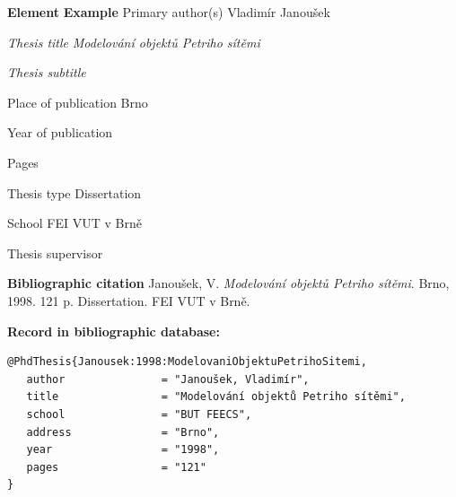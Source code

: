\newpage
\label{pr-akademicka-prace2}
\begin{tabbing} 
\zarazky
\textbf{Element} \> \textbf{Example} \odradkovani
Primary author(s) \>
Vladimír {\sc Janoušek}

\odradkovani
{\em Thesis title} \>
{\em Modelování objektů Petriho sítěmi}

\odradkovani
{\em Thesis subtitle}\footnotemark[1] \>

\odradkovani
Place of publication \>
Brno

\odradkovani
Year of publication 

\odradkovani
Pages\footnotemark[1] 

\odradkovani
Thesis type \>
Dissertation

\odradkovani
School \>
FEI VUT v Brně

\odradkovani
Thesis supervisor\footnotemark[1] \>

\odradkovani
\end{tabbing}

\noindent \textbf{Bibliographic citation} \odradkovani
{\sc Janoušek}, V. {\em Modelování objektů Petriho sítěmi}. Brno, 1998. 121 p. Dissertation. FEI VUT v Brně.

\bigskip \bigskip
\noindent \textbf{Record in bibliographic database:}
\vspace{-0.5em}
\begin{verbatim}
@PhdThesis{Janousek:1998:ModelovaniObjektuPetrihoSitemi,
   author               = "Janoušek, Vladimír",
   title                = "Modelování objektů Petriho sítěmi",
   school               = "BUT FEECS",
   address              = "Brno",
   year                 = "1998",
   pages                = "121"
}
\end{verbatim}


\newpage
